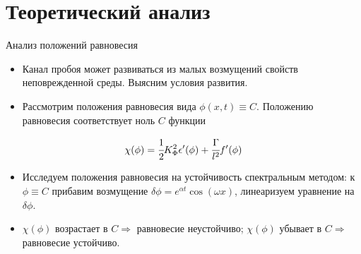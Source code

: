 \section{Теоретический анализ}

\begin{frame}{Анализ положений равновесия}
\begin{itemize}
	\item Канал пробоя может развиваться из малых возмущений свойств неповрежденной среды. Выясним условия развития.
	\item Рассмотрим положения равновесия вида $\phi(x, t) \equiv C$. Положению равновесия соответствует ноль $C$ функции
\end{itemize}
$$\chi(\phi) = \cfrac{1}{2} K_\Phi^2 \epsilon'(\phi) + \cfrac{\Gamma}{l^2} f'(\phi)$$
\vspace{-0.5cm}
\begin{itemize}
	\item Исследуем положения равновесия на устойчивость спектральным методом: к $\phi \equiv C$ прибавим возмущение $\delta \phi = e^{\alpha t} \cos(\omega x)$, линеаризуем уравнение на $\delta \phi$.
	\item $\chi(\phi)$ возрастает в $C \Longrightarrow$ равновесие неустойчиво; $\chi(\phi)$ убывает в $C \Longrightarrow$ равновесие устойчиво.
\end{itemize}
\end{frame}


